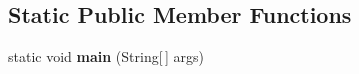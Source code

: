 \subsection*{Static Public Member Functions}
\begin{DoxyCompactItemize}
\item 
\hypertarget{classcom_1_1shephertz_1_1app42_1_1paas_1_1sdk_1_1windows_1_1geo_1_1_geo_response_builder_ad3b4bf01fc7894c94a0021e88be2af94}{static void {\bfseries main} (String\mbox{[}$\,$\mbox{]} args)}\label{classcom_1_1shephertz_1_1app42_1_1paas_1_1sdk_1_1windows_1_1geo_1_1_geo_response_builder_ad3b4bf01fc7894c94a0021e88be2af94}

\end{DoxyCompactItemize}
